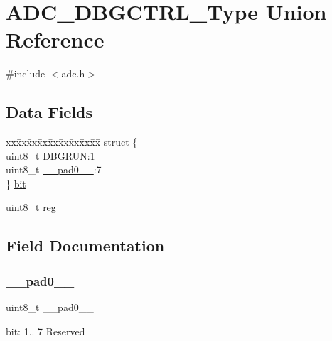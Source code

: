 \hypertarget{union_a_d_c___d_b_g_c_t_r_l___type}{}\section{A\+D\+C\+\_\+\+D\+B\+G\+C\+T\+R\+L\+\_\+\+Type Union Reference}
\label{union_a_d_c___d_b_g_c_t_r_l___type}


{\ttfamily \#include $<$adc.\+h$>$}

\subsection*{Data Fields}
\begin{DoxyCompactItemize}
\item 
\begin{tabbing}
xx\=xx\=xx\=xx\=xx\=xx\=xx\=xx\=xx\=\kill
struct \{\\
\>uint8\_t \mbox{\hyperlink{union_a_d_c___d_b_g_c_t_r_l___type_a1e1cc79f6834369b9dd0c6676a0d8781}{DBGRUN}}:1\\
\>uint8\_t \mbox{\hyperlink{union_a_d_c___d_b_g_c_t_r_l___type_a8b4eebe79ded0459acec2f4950102ba3}{\_\_pad0\_\_}}:7\\
\} \mbox{\hyperlink{union_a_d_c___d_b_g_c_t_r_l___type_a6fc9136d519dd872959484d5fc4b1ce4}{bit}}\\

\end{tabbing}\item 
uint8\+\_\+t \mbox{\hyperlink{union_a_d_c___d_b_g_c_t_r_l___type_a9428adc9af4653a2050e2536b55dec8d}{reg}}
\end{DoxyCompactItemize}


\subsection{Field Documentation}
\mbox{\label{union_a_d_c___d_b_g_c_t_r_l___type_a8b4eebe79ded0459acec2f4950102ba3}} 
\subsubsection{\texorpdfstring{\_\_pad0\_\_}{\_\_pad0\_\_}}
{\footnotesize\ttfamily uint8\+\_\+t \+\_\+\+\_\+pad0\+\_\+\+\_\+}

bit\+: 1.. 7 Reserved \mbox{\label{union_a_d_c___d_b_g_c_t_r_l___type_a6fc9136d519dd872959484d5fc4b1ce4}} 
